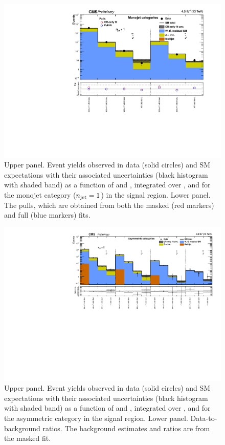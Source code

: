 \clearpage
\begin{figure}[h!]
  \centering
  \caption{Upper panel. Event yields observed in data (solid circles)
    and SM expectations with their associated uncertainties (black
    histogram with shaded band) as a function of \nb and \scalht,
    integrated over \mht, and for the monojet category ($n_{\text{jet}} = 1$)
    in the signal region. Lower panel. The pulls, which are obtained
    from both the masked (red markers) and full (blue markers) fits. }
  \label{fig:mr_mono_pulls}
  \includegraphics[width=1.\linewidth]{figures/results/mono/summaryPlot_Monojet_prefit_overlay_fit_b}
\end{figure}


\clearpage
\begin{figure}[h!]
  \centering
  \caption{Upper panel. Event yields observed in data (solid circles)
    and SM expectations with their associated uncertainties (black
    histogram with shaded band) as a function of \nb and \scalht,
    integrated over \mht, and for the asymmetric \njet category
    in the signal region. Lower panel. Data-to-background ratios. The
    background estimates and ratios are from the masked fit. }
  \label{fig:mr_asym_pre}
  \includegraphics[width=1.\linewidth]{figures/results/asym/summaryPlot_Asymmetric_prefit}
\end{figure}

